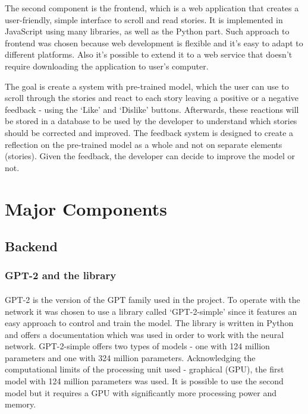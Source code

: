 \documentclass[12pt]{report}
\begin{document}
The second component is the frontend, which is a web application that creates a user-friendly, simple interface
to scroll and read stories. It is implemented in JavaScript using many libraries, as well as the Python part.
Such approach to frontend was chosen because web development is flexible and it's easy to adapt to different
platforms. Also it's possible to extend it to a web service that doesn't require downloading the application
to user's computer.

The goal is create a system with pre-trained model, which the user can use to scroll through the stories and 
react to each story leaving a positive or a negative feedback - using the `Like' and `Dislike' buttons. Afterwards,
these reactions will be stored in a database to be used by the developer to understand which stories should be
corrected and improved. The feedback system is designed to create a reflection on the pre-trained model as a whole and
not on separate elements (stories). Given the feedback, the developer can decide to improve the model or not.

\clearpage

\section*{Major Components}

\subsection*{Backend}

\subsubsection*{GPT-2 and the library}
\paragraph{}
GPT-2 is the version of the GPT family used in the project. To operate with the network it was chosen to use a 
library called `GPT-2-simple' \citep{gpt-2-simple-git} since it features an easy approach to control and train the model.
The library is written in Python and offers a documentation which was used in order to work with the neural network.
GPT-2-simple offers two types of models - one with 124 million parameters and one with 324 million parameters. 
Acknowledging the computational limits of the processing unit used - graphical (GPU), the first model with 124 million
parameters was used. It is possible to use the second model but it requires a GPU with significantly more processing power and
memory. 
\end{document}
